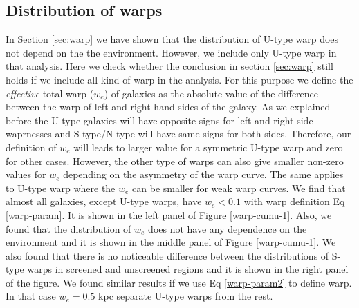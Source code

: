 \documentclass{emulateapj}
\begin{document}
\subsection{Distribution of warps}
\label{ap:warp-distri}
In Section \ref{sec:warp} we have shown that the distribution of
U-type warp does not depend on the the environment. However, we include
only U-type warp in that analysis. Here we check whether the conclusion in
 section \ref{sec:warp} still holds if we include all kind of
warp in the analysis. For this purpose we define the \textit{effective}
total warp ($w_e$) of galaxies as the absolute value of the difference
between the warp of left and right hand sides of the galaxy. As we
explained before the U-type galaxies will have opposite signs for left and 
right side waprnesses and S-type/N-type will have same signs for both sides.
Therefore, our definition of $w_e$ will leads to larger value for a symmetric
U-type warp and zero for other cases. However, the other type of warps can also
give smaller non-zero values for $w_e$ depending on the asymmetry of the warp
curve. The same applies to U-type warp where the $w_e$ can be smaller for weak
warp curves. We find that almost all galaxies, except U-type warps, have
$w_e < 0.1$ with warp definition Eq \ref{warp-param}. It is shown in the
left panel of Figure \ref{warp-cumu-1}. Also, we found that the distribution of
$w_e$ does not have any dependence on the environment and it is shown in the
middle panel of Figure \ref{warp-cumu-1}. We also found that there is no 
noticeable difference between the distributions of S-type warps in screened and
unscreened regions and it is shown in the right panel of the figure. We found
similar results if we use Eq \ref{warp-param2} to define
warp. In that case $w_e = 0.5$ kpc separate U-type warps from the rest. 
\end{document}

